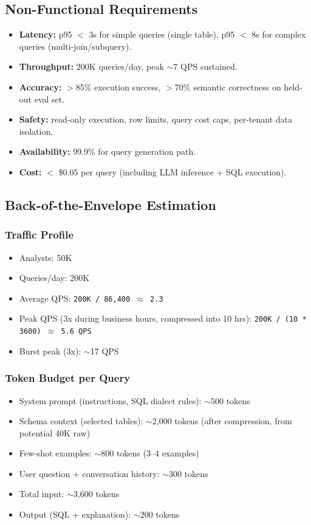 \subsection*{Non-Functional Requirements}

\begin{itemize}
  \item \textbf{Latency:} p95 $<$ 3s for simple queries (single table), p95 $<$ 8s for complex queries (multi-join/subquery).
  \item \textbf{Throughput:} 200K queries/day, peak $\sim$7 QPS sustained.
  \item \textbf{Accuracy:} $>$85\% execution success, $>$70\% semantic correctness on held-out eval set.
  \item \textbf{Safety:} read-only execution, row limits, query cost caps, per-tenant data isolation.
  \item \textbf{Availability:} 99.9\% for query generation path.
  \item \textbf{Cost:} $<$ \$0.05 per query (including LLM inference + SQL execution).
\end{itemize}

\subsection*{Back-of-the-Envelope Estimation}

\subsubsection*{Traffic Profile}

\begin{itemize}
  \item Analysts: 50K
  \item Queries/day: 200K
  \item Average QPS: \texttt{200K / 86,400 $\approx$ 2.3}
  \item Peak QPS (3x during business hours, compressed into 10 hrs): \texttt{200K / (10 * 3600) $\approx$ 5.6 QPS}
  \item Burst peak (3x): $\sim$17 QPS
\end{itemize}

\subsubsection*{Token Budget per Query}

\begin{itemize}
  \item System prompt (instructions, SQL dialect rules): $\sim$500 tokens
  \item Schema context (selected tables): $\sim$2,000 tokens (after compression, from potential 40K raw)
  \item Few-shot examples: $\sim$800 tokens (3--4 examples)
  \item User question + conversation history: $\sim$300 tokens
  \item Total input: $\sim$3,600 tokens
  \item Output (SQL + explanation): $\sim$200 tokens
\end{itemize}

